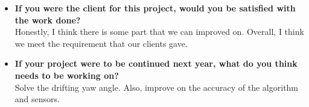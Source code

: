 \begin{itemize}
		\item \textbf{If you were the client for this project, would you be satisfied with the work done?}
		\\Honestly, I think there is some part that we can improved on. Overall, I think we meet the requirement that our clients gave.\\

		\item \textbf{If your project were to be continued next year, what do you think needs to be working on?}
		\\Solve the drifting yaw angle. Also, improve on the accuracy of the algorithm and sensors.\\
	\end{itemize}





















